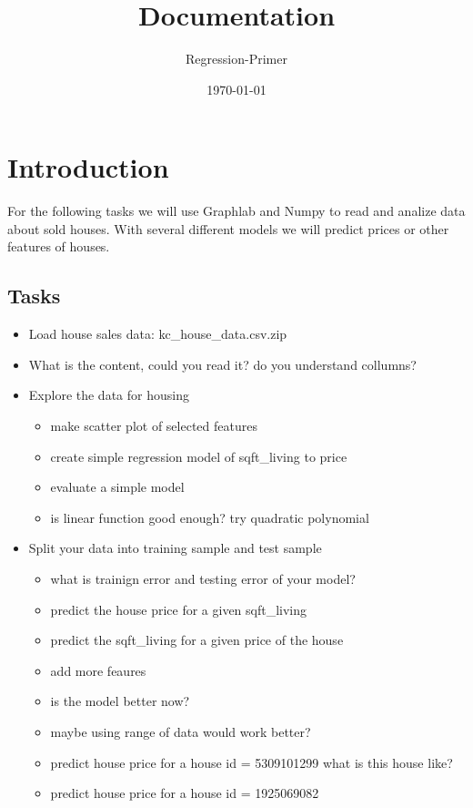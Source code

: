 \documentclass[12pt]{scrreprt}
\begin{document}
\subject{Data Science}
\title{Documentation}
\subtitle{Regression-Primer}
\author{}
\date{\large{\today}}
\publishers{Eicker Niklas, Halastra Szymon}
\maketitle
\tableofcontents



\chapter{Introduction} 
\label{chpt:intro}

For the following tasks we will use Graphlab and Numpy to read and analize data about sold houses. With several different models we will predict prices or other features of houses.

\section{Tasks}
\label{sec:task}

\begin{itemize}
\item Load house sales data: kc\_house\_data.csv.zip
\item What is the content, could you read it? do you understand collumns?
\item Explore the data for housing
\begin{itemize}
  \item make scatter plot of selected features
  \item create simple regression model of sqft\_living to price
  \item evaluate a simple model
  \item is linear function good enough? try quadratic polynomial  
\end{itemize}

\item Split your data into training sample and test sample
\begin{itemize}
  \item what is trainign error and testing error of your model?
  \item predict the house price for a given sqft\_living
  \item predict the sqft\_living for a given price of the house
  \item add more feaures
  \item is the model better now?
  \item maybe using range of data would work better?
  \item predict house price for a house id = 5309101299
      what is this house like?
  \item predict house price for a house id = 1925069082  
\end{itemize}
\end{itemize}
\end{document}
